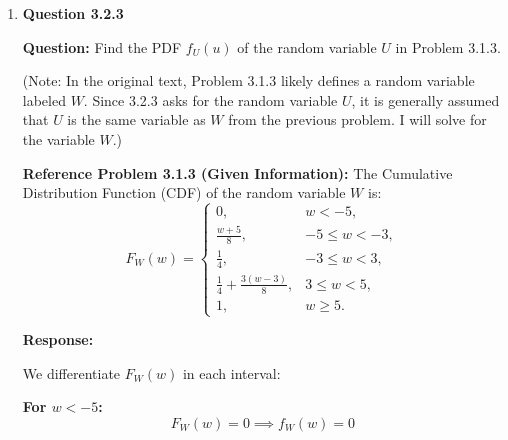 \documentclass[12pt]{article}
\begin{document}
\begin{enumerate}[label=\textbf{\arabic*.}, leftmargin=*]
\vspace{0.3in}

\textbf{Response:}

We differentiate $F_X(x)$ piece by piece for each interval:

\textbf{For $x < -1$:}
\[ F_X(x) = 0 \implies \frac{d}{dx}(0) = 0 \]

\textbf{For $-1 < x < 1$:}
\[ F_X(x) = \frac{x + 1}{2} = \frac{1}{2}x + \frac{1}{2} \]
\[ \frac{d}{dx}\left(\frac{1}{2}x + \frac{1}{2}\right) = \frac{1}{2} \]

\textbf{For $x > 1$:}
\[ F_X(x) = 1 \implies \frac{d}{dx}(1) = 0 \]

(Note: Since the CDF is continuous at the boundaries $x=-1$ and $x=1$, there are no impulses (delta functions) in the PDF.)

\textbf{Answer:}
Combining these results, the PDF is:
\[
f_X(x) =
\begin{cases}
\frac{1}{2}, & -1 \le x < 1, \\
0, & \text{otherwise.}
\end{cases}
\]

\newpage
\item \textbf{Question 3.2.3}

\textbf{Question:} Find the PDF $f_U(u)$ of the random variable $U$ in Problem 3.1.3.

(Note: In the original text, Problem 3.1.3 likely defines a random variable labeled $W$. Since 3.2.3 asks for the random variable $U$, it is generally assumed that $U$ is the same variable as $W$ from the previous problem. I will solve for the variable $W$.)

\textbf{Reference Problem 3.1.3 (Given Information):}
The Cumulative Distribution Function (CDF) of the random variable $W$ is:
\[
F_W(w) = \begin{cases}
0, & w < -5, \\
\frac{w+5}{8}, & -5 \le w < -3, \\
\frac{1}{4}, & -3 \le w < 3, \\
\frac{1}{4} + \frac{3(w-3)}{8}, & 3 \le w < 5, \\
1, & w \ge 5.
\end{cases}
\]

\vspace{0.3in}

\textbf{Response:}

We differentiate $F_W(w)$ in each interval:

\textbf{For $w < -5$:}
\[ F_W(w) = 0 \implies f_W(w) = 0 \]


\end{enumerate}
\end{document}
